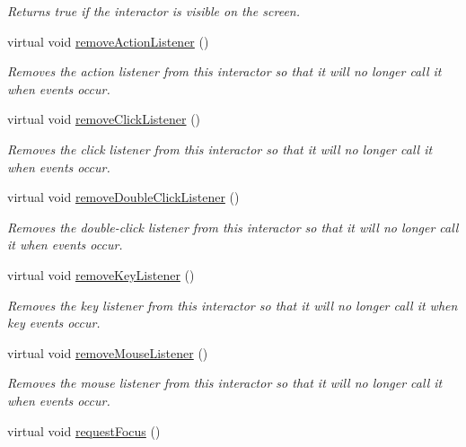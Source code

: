 \begin{DoxyCompactItemize}
\begin{DoxyCompactList}\small\item\em Returns true if the interactor is visible on the screen. \end{DoxyCompactList}\item 
virtual void \mbox{\hyperlink{classsgl_1_1GInteractor_ab7fe7a876367b87cf7202f947f1d05e4}{remove\+Action\+Listener}} ()
\begin{DoxyCompactList}\small\item\em Removes the action listener from this interactor so that it will no longer call it when events occur. \end{DoxyCompactList}\item 
virtual void \mbox{\hyperlink{classsgl_1_1GInteractor_ad39d0325cde6b97ebda4b9d7787c633b}{remove\+Click\+Listener}} ()
\begin{DoxyCompactList}\small\item\em Removes the click listener from this interactor so that it will no longer call it when events occur. \end{DoxyCompactList}\item 
virtual void \mbox{\hyperlink{classsgl_1_1GInteractor_aa4250907e4cdd77349c04f0cf5cdd3d3}{remove\+Double\+Click\+Listener}} ()
\begin{DoxyCompactList}\small\item\em Removes the double-\/click listener from this interactor so that it will no longer call it when events occur. \end{DoxyCompactList}\item 
virtual void \mbox{\hyperlink{classsgl_1_1GInteractor_a43095f41cab3be732b49f29970484b05}{remove\+Key\+Listener}} ()
\begin{DoxyCompactList}\small\item\em Removes the key listener from this interactor so that it will no longer call it when key events occur. \end{DoxyCompactList}\item 
virtual void \mbox{\hyperlink{classsgl_1_1GInteractor_aff47f71ce47e688a07c9d38dc92fcc11}{remove\+Mouse\+Listener}} ()
\begin{DoxyCompactList}\small\item\em Removes the mouse listener from this interactor so that it will no longer call it when events occur. \end{DoxyCompactList}\item 
virtual void \mbox{\hyperlink{classsgl_1_1GInteractor_a519fb2ac767f8b2febbb50b898b8c8cb}{request\+Focus}} ()

\end{DoxyCompactItemize}
